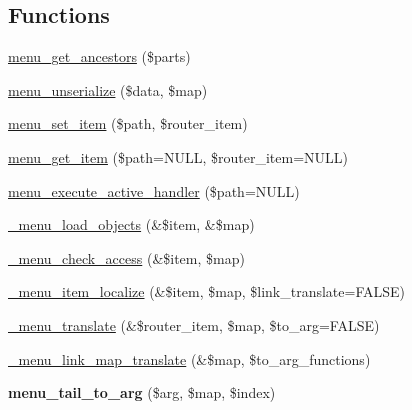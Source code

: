 \subsection*{Functions}
\begin{CompactItemize}
\item 
\hyperlink{group__menu_g24ddfa75da5f03482a2df2c9c8d1f711}{menu\_\-get\_\-ancestors} (\$parts)
\item 
\hyperlink{group__menu_g3f9fe4d53dc9d9c3724f956f1465b5be}{menu\_\-unserialize} (\$data, \$map)
\item 
\hyperlink{group__menu_g731543157fbe59176d20af2282df5f75}{menu\_\-set\_\-item} (\$path, \$router\_\-item)
\item 
\hyperlink{group__menu_g855b1ca6ef9e44eb6107a2b9d0f581df}{menu\_\-get\_\-item} (\$path=NULL, \$router\_\-item=NULL)
\item 
\hyperlink{group__menu_gc2cef001e8197fecd49924e6e0e251c6}{menu\_\-execute\_\-active\_\-handler} (\$path=NULL)
\item 
\hyperlink{group__menu_g8aeba67f5ade33d997f9869ce3e41fa6}{\_\-menu\_\-load\_\-objects} (\&\$item, \&\$map)
\item 
\hyperlink{group__menu_g255e3052e7679155b37b82d9bcbe19c9}{\_\-menu\_\-check\_\-access} (\&\$item, \$map)
\item 
\hyperlink{group__menu_g3b0c0f37db66372ac4e90afa35b191e9}{\_\-menu\_\-item\_\-localize} (\&\$item, \$map, \$link\_\-translate=FALSE)
\item 
\hyperlink{group__menu_g0e8535f35bcd1a03e71120a2d6ecc099}{\_\-menu\_\-translate} (\&\$router\_\-item, \$map, \$to\_\-arg=FALSE)
\item 
\hyperlink{group__menu_gac930b7a3cacbf70430c8dc3aa884198}{\_\-menu\_\-link\_\-map\_\-translate} (\&\$map, \$to\_\-arg\_\-functions)
\item 
\hypertarget{group__menu_gad6215c5bf31dffe08a2b75e66345d10}{
\textbf{menu\_\-tail\_\-to\_\-arg} (\$arg, \$map, \$index)}
\label{group__menu_gad6215c5bf31dffe08a2b75e66345d10}


\end{CompactItemize}
